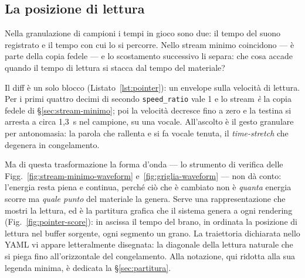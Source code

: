 %
%

\subsection{La posizione di lettura}\label{sec:pointer}

Nella granulazione di campioni i tempi in gioco sono due: il tempo del
suono registrato e il tempo con cui lo si percorre. Nello stream minimo
coincidono --- è parte della copia fedele --- e lo scostamento
successivo li separa: che cosa accade quando il tempo di lettura si
stacca dal tempo del materiale?

    

Il diff è un solo blocco (Listato~\ref{lst:pointer}): un envelope sulla
velocità di lettura. Per i primi quattro decimi di secondo
\texttt{speed\_ratio} vale 1 e lo stream \emph{è} la copia fedele di
\S\ref{sec:stream-minimo}; poi la velocità decresce fino a zero e la
testina si arresta a circa 1,3~s nel campione, su una vocale. All'ascolto
è il gesto granulare per antonomasia: la parola che rallenta e si fa
vocale tenuta, il \emph{time-stretch} che degenera in congelamento.

Ma di questa trasformazione la forma d'onda --- lo strumento di verifica
delle Figg.~\ref{fig:stream-minimo-waveform}
e~\ref{fig:griglia-waveform} --- non dà conto: l'energia resta piena e
continua, perché ciò che è cambiato non è \emph{quanta} energia scorre ma
\emph{quale punto} del materiale la genera. Serve una rappresentazione
che mostri la lettura, ed è la partitura grafica che il sistema genera a
ogni rendering (Fig.~\ref{fig:pointer-score}): in ascissa il tempo del
brano, in ordinata la posizione di lettura nel buffer sorgente, ogni
segmento un grano. La traiettoria dichiarata nello YAML vi appare
letteralmente disegnata: la diagonale della lettura naturale che si piega
fino all'orizzontale del congelamento. Alla notazione, qui ridotta alla
sua legenda minima, è dedicata la \S\ref{sec:partitura}.


